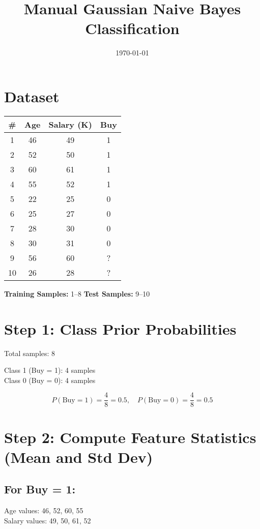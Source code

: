 \documentclass{article}
\title{Manual Gaussian Naive Bayes Classification}
\author{}
\date{\today}  %
\begin{document}
\maketitle

\section*{Dataset}

\begin{center}
\begin{tabular}{|c|c|c|c|}
\hline
\# & Age & Salary (K) & Buy \\
\hline
1 & 46 & 49 & 1 \\
2 & 52 & 50 & 1 \\
3 & 60 & 61 & 1 \\
4 & 55 & 52 & 1 \\
5 & 22 & 25 & 0 \\
6 & 25 & 27 & 0 \\
7 & 28 & 30 & 0 \\
8 & 30 & 31 & 0 \\
9 & 56 & 60 & ? \\
10 & 26 & 28 & ? \\
\hline
\end{tabular}
\end{center}

\textbf{Training Samples:} 1–8 \quad \textbf{Test Samples:} 9–10

\section*{Step 1: Class Prior Probabilities}

Total samples: 8

Class 1 (Buy = 1): 4 samples \\
Class 0 (Buy = 0): 4 samples

\[
P(\text{Buy} = 1) = \frac{4}{8} = 0.5, \quad P(\text{Buy} = 0) = \frac{4}{8} = 0.5
\]

\section*{Step 2: Compute Feature Statistics (Mean and Std Dev)}

\subsection*{For Buy = 1:}

Age values: 46, 52, 60, 55 \\
Salary values: 49, 50, 61, 52
\end{document}
